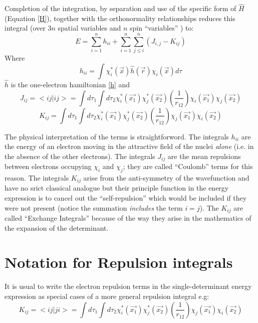 Completion of the integration, by separation and use of
the specific form of $\hat{H}$ (Equation \ref{H}), 
together with the orthonormality
relationships reduces this integral (over $3n$ spatial variables
and $n$ spin ``variables'' ) to:
\begin{equation}
E = \sum_{i=1}^{n} { h_{ii} }
+ \sum_{i=1}^n { \sum_{j \leq i}^{n} {
( J_{i,j} - K_{ij} ) } }
\end{equation}
Where
\[
h_{ii} = \int { \chi_i^* (\vec{x}) \hat{h}(\vec{r}) \chi_i (\vec{x}) d\tau }
\]
$\hat{h}$ is the one-electron hamiltonian \ref{h} and 
\begin{equation}
J_{ij} = < i j | i j > = 
\int { d\tau_1 \int { d\tau_2 \chi_i^* (\vec{x_1})\chi_j^* (\vec{x_2})
\left ( \frac{1}{r_{12}} \right )
\chi_i (\vec{x_1})\chi_j (\vec{x_2}) } }
\end{equation}
\begin{equation}
K_{ij} =  
\int { d\tau_1 \int { d\tau_2 \chi_i^* (\vec{x_1})\chi_j^* (\vec{x_2})
\left ( \frac{1}{r_{12}} \right )
\chi_j (\vec{x_1})\chi_i (\vec{x_2}) } }
\end{equation}

The physical interpretation of the terms is straightforword.
The integrals $h_{ii}$ are the energy of an electron moving
in the attractive field of the nuclei {\em alone} (i.e. in
the absence of the other electrons). The integrals $J_{ij}$
are the mean repulsions between electrons occupying $\chi_i$
and $\chi_j$; they are called ``Coulomb'' terms for this reason.
The integrals $K_{ij}$ arise from the anti-symmetry of the wavefunction
and have no srict classical analogue but their principle function
in the energy expression is to cancel out the ``self-repulsion''
which would be included if they were not present (notice the summation
{\em includes} the term $i=j$). The $K_{ij}$ are called
``Exchange Integrals'' because of the way they arise in
the mathematics of the expansion of the determinant.
\section{\sf Notation for Repulsion integrals}
It is usual to write the electron repulsion terms in the 
single-determinant energy expression as special cases of a
more general repulsion integral e.g:
\begin{equation}
K_{ij} = < i j | j i > = 
\int { d\tau_1 \int { d\tau_2 \chi_i^* (\vec{x_1})\chi_j^* (\vec{x_2})
\left ( \frac{1}{r_{12}} \right )
\chi_j (\vec{x_1})\chi_i (\vec{x_2}) } }
\end{equation}

